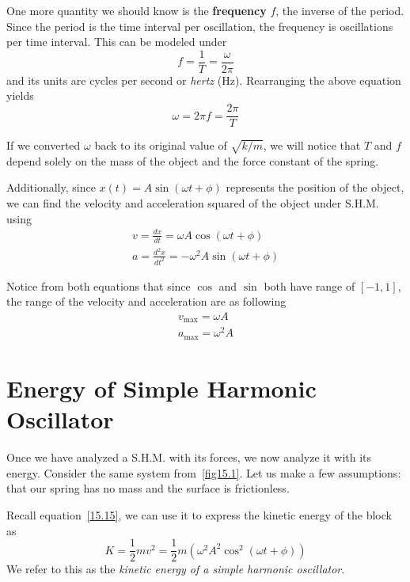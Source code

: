 One more quantity we should know is the \textbf{frequency} $f$, the inverse of the period.
Since the period is the time interval per oscillation, the frequency is oscillations per time interval.
This can be modeled under
\begin{equation}\label{15.11}
    f = \frac{1}{T} = \frac{\omega}{2\pi}
\end{equation}
and its units are cycles per second or \textit{hertz} (Hz). Rearranging the above equation yields
\begin{equation}\label{15.12}
    \omega = 2\pi f = \frac{2\pi}{T}
\end{equation}

If we converted $\omega$ back to its original value of $\sqrt{k/m}$, we will notice that $T$ and $f$
depend solely on the mass of the object and the force constant of the spring.

Additionally, since $x(t) = A\sin(\omega t + \phi)$ represents the position of the object, we can
find the velocity and acceleration squared of the object under S.H.M. using
\begin{eqnarray}
    v = \frac{dx}{dt} = \omega A\cos(\omega t + \phi)\label{15.15}\\
    a = \frac{d^2x}{dt^2} = -\omega^2 A\sin(\omega t + \phi)\label{15.16}
\end{eqnarray}

Notice from both equations that since $\cos$ and $\sin$ both have range of $[-1, 1]$, the range of 
the velocity and acceleration are as following
\begin{eqnarray}
    v_{\max} = \omega A\\
    a_{\max} = \omega^2 A
\end{eqnarray}

\section{Energy of Simple Harmonic Oscillator}

Once we have analyzed a S.H.M. with its forces, we now analyze it with its energy. Consider the 
same system from~\ref{fig15.1}. Let us make a few assumptions: that our spring has no mass and the 
surface is frictionless.

Recall equation~\eqref{15.15}, we can use it to express the kinetic energy of the block as 
\begin{equation}\label{15.19}
    K = \frac{1}{2}mv^2 = \frac{1}{2}m\left(\omega^2 A^2 \cos^2(\omega t + \phi)\right)
\end{equation}
We refer to this as the \textit{kinetic energy of a simple harmonic oscillator}.

